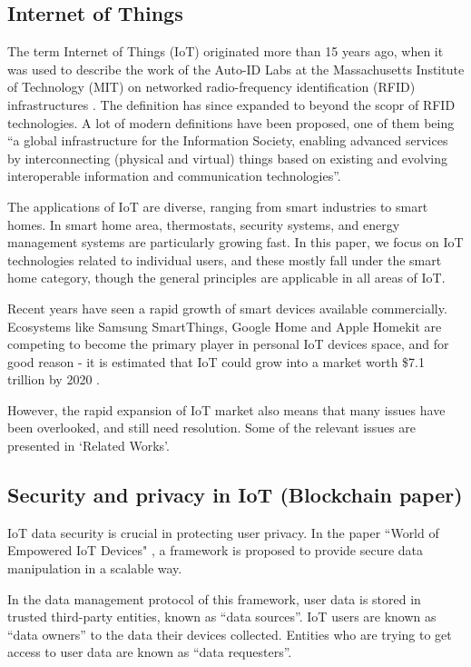 \subsection{Internet of Things}
The term Internet of Things (IoT) originated more than 15 years ago, when it was used to describe the work of the Auto-ID Labs at the
Massachusetts Institute of Technology (MIT) on networked radio-frequency identification (RFID) infrastructures \cite{atzori}. The definition has since expanded to beyond the scopr of RFID technologies. A lot of modern definitions have been proposed, one of them being ``a global infrastructure for the Information Society, enabling advanced services by interconnecting (physical and virtual) things based on existing and evolving interoperable information and communication technologies''\cite{itu}.

The applications of IoT are diverse, ranging from smart industries to smart homes. In smart home area, thermostats, security systems, and energy management systems are particularly growing fast. In this paper, we focus on IoT technologies related to individual users, and these mostly fall under the smart home category, though the general principles are applicable in all areas of IoT.

Recent years have seen a rapid growth of smart devices available commercially. Ecosystems like Samsung SmartThings, Google Home and Apple Homekit are competing to become the primary player in personal IoT devices space, and for good reason -  it is estimated that IoT could grow into a market worth \$7.1 trillion by 2020 \cite{idc}.

However, the rapid expansion of IoT market also means that many issues have been overlooked, and still need resolution. Some of the relevant issues are presented in `Related Works'.

\subsection{Security and privacy in IoT (Blockchain paper)}
IoT data security is crucial in protecting user privacy. In the paper ``World of Empowered IoT Devices" \cite{campbell}, a framework is proposed to provide secure data manipulation in a scalable way.

In the data management protocol of this framework, user data is stored in trusted third-party entities, known as “data sources”. IoT users are known as “data owners” to the data their devices collected. Entities who are trying to get access to user data are known as “data requesters”. 


